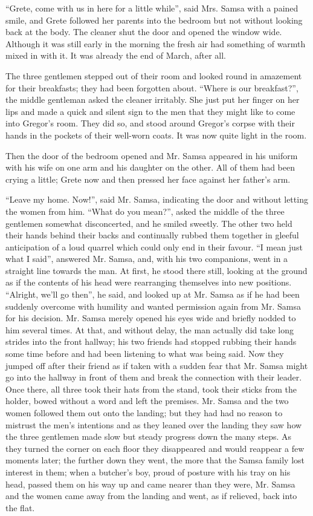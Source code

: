 “Grete, come with us in here for a little while”, said Mrs. Samsa with
a pained smile, and Grete followed her parents into the bedroom but not
without looking back at the body. The cleaner shut the door and opened
the window wide. Although it was still early in the morning the fresh
air had something of warmth mixed in with it. It was already the end of
March, after all.

The three gentlemen stepped out of their room and looked round in
amazement for their breakfasts; they had been forgotten about. “Where
is our breakfast?”, the middle gentleman asked the cleaner irritably.
She just put her finger on her lips and made a quick and silent sign to
the men that they might like to come into Gregor’s room. They did so,
and stood around Gregor’s corpse with their hands in the pockets of
their well-worn coats. It was now quite light in the room.

Then the door of the bedroom opened and Mr. Samsa appeared in his
uniform with his wife on one arm and his daughter on the other. All of
them had been crying a little; Grete now and then pressed her face
against her father’s arm.

“Leave my home. Now!”, said Mr. Samsa, indicating the door and without
letting the women from him. “What do you mean?”, asked the middle of
the three gentlemen somewhat disconcerted, and he smiled sweetly. The
other two held their hands behind their backs and continually rubbed
them together in gleeful anticipation of a loud quarrel which could
only end in their favour. “I mean just what I said”, answered Mr.
Samsa, and, with his two companions, went in a straight line towards
the man. At first, he stood there still, looking at the ground as if
the contents of his head were rearranging themselves into new
positions. “Alright, we’ll go then”, he said, and looked up at Mr.
Samsa as if he had been suddenly overcome with humility and wanted
permission again from Mr. Samsa for his decision. Mr. Samsa merely
opened his eyes wide and briefly nodded to him several times. At that,
and without delay, the man actually did take long strides into the
front hallway; his two friends had stopped rubbing their hands some
time before and had been listening to what was being said. Now they
jumped off after their friend as if taken with a sudden fear that Mr.
Samsa might go into the hallway in front of them and break the
connection with their leader. Once there, all three took their hats
from the stand, took their sticks from the holder, bowed without a word
and left the premises. Mr. Samsa and the two women followed them out
onto the landing; but they had had no reason to mistrust the men’s
intentions and as they leaned over the landing they saw how the three
gentlemen made slow but steady progress down the many steps. As they
turned the corner on each floor they disappeared and would reappear a
few moments later; the further down they went, the more that the Samsa
family lost interest in them; when a butcher’s boy, proud of posture
with his tray on his head, passed them on his way up and came nearer
than they were, Mr. Samsa and the women came away from the landing and
went, as if relieved, back into the flat.

